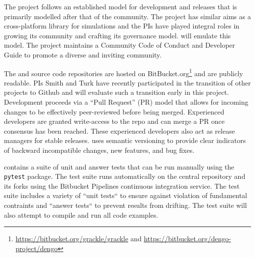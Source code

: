 The \grackle{} project follows an established model for development
and releases that is primarily modelled after that of the \yt{}
community.  The \yt{} project has similar aims as a cross-platform
library for simulations and the PIs have played integral roles in
growing  its community and crafting its governance model.
\dengo{} will emulate this model. The \grackle{}
project maintains a Community Code of Conduct and Developer Guide
to promote a diverse and inviting community.

The \grackle{} and \dengo{}
source code repositories are hosted on
BitBucket.org\footnote{\url{https://bitbucket.org/grackle/grackle} and
\url{https://bitbucket.org/dengo-project/dengo}} and are publicly
readable. PIs Smith and Turk have recently participated in the
transition of other projects to Github and will evaluate such a
transition early in this project. Development proceeds via a ``Pull Request''
(PR) model that allows for incoming changes to be effectively
peer-reviewed before being merged.
Experienced developers are granted write-access to the repo and can
merge a PR once consensus has been reached.
These experienced developers also act as release managers for stable
releases. \grackle{} uses semantic versioning to provide clear
indicators of backward incompatible changes, new features, and bug fixes.


\grackle{} contains a suite of unit and answer
tests that can be run manually using the \texttt{pytest} package.  The
test suite runs automatically on the central repository and its
forks using the Bitbucket Pipelines continuous integration service.
The test suite includes a variety of ``unit tests`` to ensure against
violation of fundamental contraints and ``answer tests`` to prevent
results from drifting. The test suite will also attempt to compile and
run all code examples.


